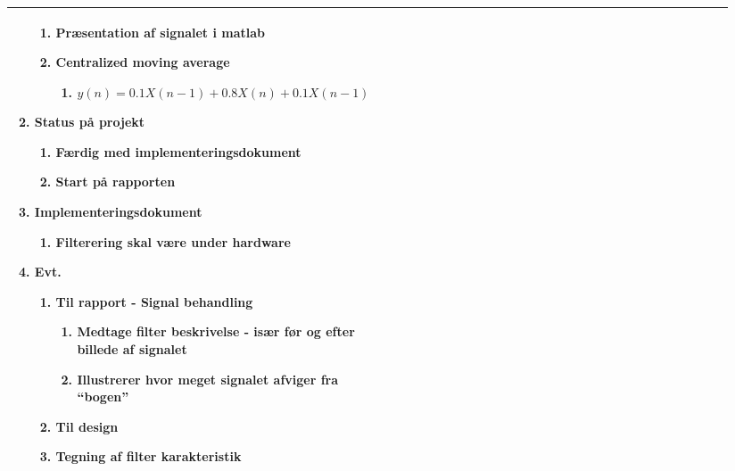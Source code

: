\begin{longtable}{|p{0.24\linewidth}|p{0.7\linewidth}|}
\begin{enumerate}
\begin{enumerate}
				\item Præsentation af signalet i matlab
				\item Centralized moving average 
				\begin{enumerate}
					\item  $y(n) = 0.1X(n-1) + 0.8X(n) + 0.1X(n-1) $
				\end{enumerate}
			\end{enumerate}
			\item Status på projekt
			\begin{enumerate}
				\item Færdig med implementeringsdokument
				\item Start på rapporten 
			\end{enumerate}
			\item Implementeringsdokument
			\begin{enumerate}
				\item Filterering skal være under hardware 
			\end{enumerate}
			\item Evt. 
			\begin{enumerate}
				\item Til rapport - Signal behandling
				\begin{enumerate}
					\item Medtage filter beskrivelse - især før og efter billede af signalet 
					\item Illustrerer hvor meget signalet afviger fra “bogen”
				\end{enumerate}
				\item Til design 
				\item Tegning af filter karakteristik
			\end{enumerate}
		\end{enumerate}
		\\ \hline
	\end{longtable}
	
